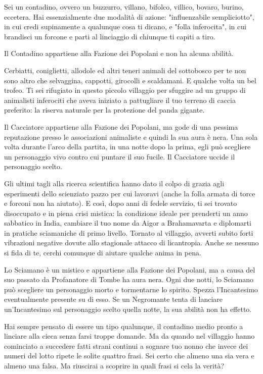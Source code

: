 {%
Sei un contadino, ovvero un buzzurro, villano, bifolco, villico, bovaro, burino, eccetera. Hai essenzialmente due modalità di azione: "influenzabile sempliciotto", in cui credi supinamente a qualunque cosa ti dicano, e "folla inferocita", in cui brandisci un forcone e parti al linciaggio di chiunque ti capiti a tiro.

Il Contadino appartiene alla Fazione dei Popolani e non ha alcuna abilità.
{%

{%
Cerbiatti, coniglietti, allodole ed altri teneri animali del sottobosco per te non sono altro che selvaggina, cappotti, girocolli e scaldamani. E qualche volta un bel trofeo. Ti sei rifugiato in questo piccolo villaggio per sfuggire ad un gruppo di animalisti inferociti che aveva iniziato a pattugliare il tuo terreno di caccia preferito: la riserva naturale per la protezione del panda gigante.

Il Cacciatore appartiene alla Fazione dei Popolani, ma gode di una pessima reputazione presso le associazioni animaliste e quindi la sua aura è nera. Una sola volta durante l'arco della partita, in una notte dopo la prima, egli può scegliere un personaggio vivo contro cui puntare il suo fucile. Il Cacciatore uccide il personaggio scelto.
{%

{%
Gli ultimi tagli alla ricerca scientifica hanno dato il colpo di grazia agli esperimenti dello scienziato pazzo per cui lavoravi (anche la folla armata di torce e forconi non ha aiutato). E così, dopo anni di fedele servizio, ti sei trovato disoccupato e in piena crisi mistica: la condizione ideale per prenderti un anno sabbatico in India, cambiare il tuo nome da Aigor a Brahamavarta e diplomarti in pratiche sciamaniche di primo livello. Tornato al villaggio, avverti subito forti vibrazioni negative dovute allo stagionale attacco di licantropia. Anche se nessuno si fida di te, cerchi comunque di aiutare qualche anima in pena.

Lo Sciamano è un mistico e appartiene alla Fazione dei Popolani, ma a causa del suo passato da Profanatore di Tombe ha aura nera. Ogni due notti, lo Sciamano può scegliere un personaggio morto e tormentarne lo spirito. Spezza l'Incantesimo eventualmente presente su di esso. Se un Negromante tenta di lanciare un'Incantesimo sul personaggio scelto quella notte, la sua abilità non ha effetto.
{%


{%
Hai sempre pensato di essere un tipo qualunque, il contadino medio pronto a linciare alla cieca senza farsi troppe domande. Ma da quando nel villaggio hanno cominciato a succedere fatti strani continui a sognare tuo nonno che invece dei numeri del lotto ripete le solite quattro frasi. Sei certo che almeno una sia vera e almeno una falsa. Ma riuscirai a scoprire in quali frasi si cela la verità?

}}}}}}}
